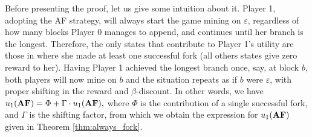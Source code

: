 Before presenting the proof, let us give some intuition about it. Player 1, adopting the AF strategy, will always start the game mining on $\varepsilon$, regardless of how many blocks Player 0 manages to append, and continues until her branch is the longest. Therefore, the only states that contribute to Player 1's utility are those in where she made at least one successful fork (all others states give zero reward to her). Having Player 1 achieved the longest branch once, say, at block $b$, both players will now mine on $b$ and the situation repeats as if $b$ were $\varepsilon$, with proper shifting in the reward and $\beta$-discount. In other words, we have
$u_1(\text{\rm {\bf AF}}) = \Phi + \Gamma\cdot u_1(\text{\rm {\bf AF}}),$
where $\Phi$ is the contribution of a single successful fork, and $\Gamma$ is the shifting factor, from which we obtain the expression for $u_1(\text{\rm {\bf AF}})$ given in Theorem \ref{thm:always_fork}.

